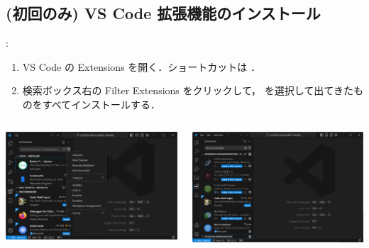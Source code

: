 \documentclass[aspectratio=169,dvipdfmx,cjk]{beamer}
\begin{document}
\subsection{(初回のみ) VS Code 拡張機能のインストール}
\begin{frame}{\insertsection \thesubsection: \insertsubsection}
  \begin{enumerate}
    \item VS Code の Extensions を開く．ショートカットは ．
    \item 検索ボックス右の Filter Extensions をクリックして， を選択して出てきたものをすべてインストールする．
  \end{enumerate}
  \begin{columns}
    \begin{column}{0.45\textwidth}
        \includegraphics[width=1.0\linewidth]{fig/vscode-extentions.png}
    \end{column}
    \begin{column}{0.45\textwidth}
      \includegraphics[width=1.0\linewidth]{fig/vscode-recommneded.png}
    \end{column}
  \end{columns}
\end{frame}
\end{document}
